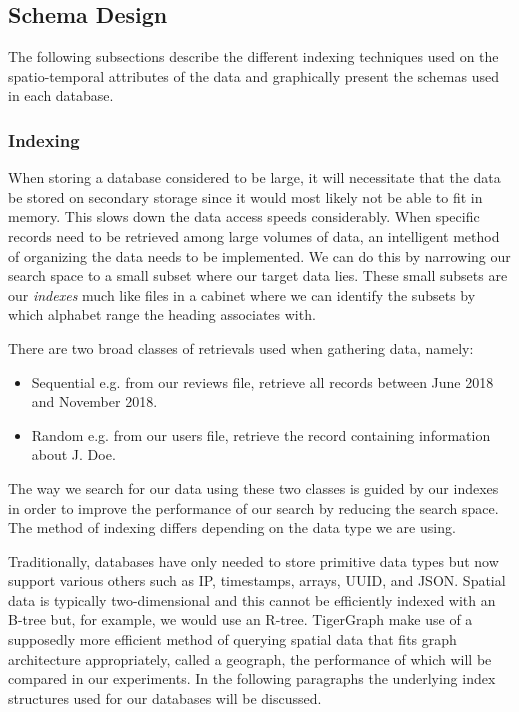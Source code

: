 \subsection{Schema Design}

The following subsections describe the different indexing techniques used on the spatio-temporal attributes of the data and graphically present the schemas used in each database.

\subsubsection{Indexing}
When storing a database considered to be large, it will necessitate that the data be stored on secondary storage since it would most likely not be able to fit in memory. This slows down the data access speeds considerably. When specific records need to be retrieved among large volumes of data, an intelligent method of organizing the data needs to be implemented. We can do this by narrowing our search space to a small subset where our target data lies. These small subsets are our \emph{indexes} much like files in a cabinet where we can identify the subsets by which alphabet range the heading associates with.

There are two broad classes\cite{btree} of retrievals used when gathering data, namely:
\begin{itemize}
    \item Sequential e.g. from our reviews file, retrieve all records between June 2018 and November 2018.
    \item Random e.g. from our users file, retrieve the record containing information about J. Doe.
\end{itemize}
The way we search for our data using these two classes is guided by our indexes in order to improve the performance of our search by reducing the search space. The method of indexing differs depending on the data type we are using.

Traditionally, databases have only needed to store primitive data types but now support various others such as IP, timestamps, arrays, UUID, and JSON. Spatial data is typically two-dimensional and this cannot be efficiently indexed with an B-tree but, for example, we would use an R-tree. TigerGraph make use of a supposedly more efficient method of querying spatial data that fits graph architecture appropriately, called a geograph, the performance of which will be compared in our experiments. In the following paragraphs the underlying index structures used for our databases will be discussed.

